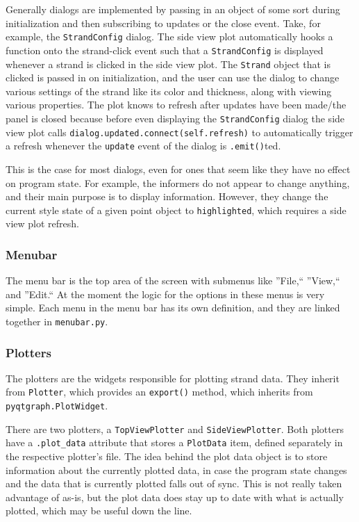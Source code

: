 \documentclass[titlepage]{article}
\begin{document}
	Generally dialogs are implemented by passing in an object of some sort during initialization and then subscribing to updates or the close event. Take, for example, the \texttt{StrandConfig} dialog. The side view plot automatically hooks a function onto the strand-click event such that a \texttt{StrandConfig} is displayed whenever a strand is clicked in the side view plot. The \texttt{Strand} object that is clicked is passed in on initialization, and the user can use the dialog to change various settings of the strand like its color and thickness, along with viewing various properties. The plot knows to refresh after updates have been made/the panel is closed because before even displaying the \texttt{StrandConfig} dialog the side view plot calls \texttt{dialog.updated.connect(self.refresh)} to automatically trigger a refresh whenever the \texttt{update} event of the dialog is \texttt{.emit()}ted.
	
	This is the case for most dialogs, even for ones that seem like they have no effect on program state. For example, the informers do not appear to change anything, and their main purpose is to display information. However, they change the current style state of a given point object to \texttt{highlighted}, which requires a side view plot refresh.
	
	\subsubsection{Menubar}
	The menu bar is the top area of the screen with submenus like ''File,`` ''View,`` and ''Edit.`` At the moment the logic for the options in these menus is very simple. Each menu in the menu bar has its own definition, and they are linked together in \texttt{menubar.py}.
	
	\subsubsection{Plotters}
	The plotters are the widgets responsible for plotting strand data. They inherit from \texttt{Plotter}, which provides an \texttt{export()} method, which inherits from \texttt{pyqtgraph.PlotWidget}.
	
	There are two plotters, a \texttt{TopViewPlotter} and \texttt{SideViewPlotter}. Both plotters have a \texttt{.plot\_data} attribute that stores a \texttt{PlotData} item, defined separately in the respective plotter's file. The idea behind the plot data object is to store information about the currently plotted data, in case the program state changes and the data that is currently plotted falls out of sync. This is not really taken advantage of as-is, but the plot data does stay up to date with what is actually plotted, which may be useful down the line.
	
\end{document}
